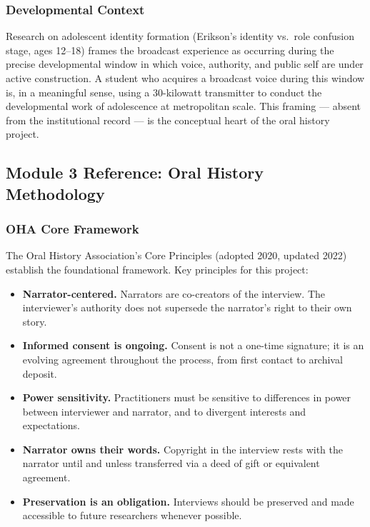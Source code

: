 \documentclass[11pt,letterpaper]{article}
\begin{document}
\subsubsection{Developmental Context}

Research on adolescent identity formation (Erikson's identity vs.\ role confusion stage, ages 12--18) frames the broadcast experience as occurring during the precise developmental window in which voice, authority, and public self are under active construction. A student who acquires a broadcast voice during this window is, in a meaningful sense, using a 30-kilowatt transmitter to conduct the developmental work of adolescence at metropolitan scale. This framing --- absent from the institutional record --- is the conceptual heart of the oral history project.

\subsection{Module 3 Reference: Oral History Methodology}

\subsubsection{OHA Core Framework}

The Oral History Association's Core Principles (adopted 2020, updated 2022) establish the foundational framework. Key principles for this project:

\begin{itemize}
  \item \textbf{Narrator-centered.} Narrators are co-creators of the interview. The interviewer's authority does not supersede the narrator's right to their own story.
  \item \textbf{Informed consent is ongoing.} Consent is not a one-time signature; it is an evolving agreement throughout the process, from first contact to archival deposit.
  \item \textbf{Power sensitivity.} Practitioners must be sensitive to differences in power between interviewer and narrator, and to divergent interests and expectations.
  \item \textbf{Narrator owns their words.} Copyright in the interview rests with the narrator until and unless transferred via a deed of gift or equivalent agreement.
  \item \textbf{Preservation is an obligation.} Interviews should be preserved and made accessible to future researchers whenever possible.
\end{itemize}
\end{document}
